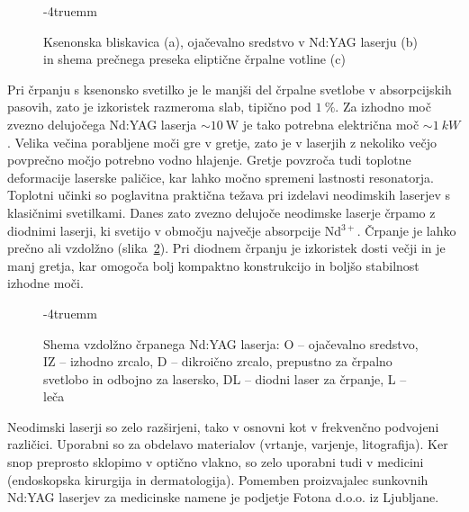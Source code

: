 \begin{figure}[ht]
\centering
\def\svgwidth{120truemm} 

\caption{Ksenonska bliskavica (a), ojačevalno sredstvo v Nd:YAG laserju (b) 
in shema prečnega preseka eliptične črpalne votline (c)}
\label{fig:Nd}
\vglue-4truemm
\end{figure}

Pri črpanju s ksenonsko svetilko je le manjši del črpalne svetlobe v
absorpcijskih pasovih, zato je izkoristek razmeroma slab, tipično 
pod $1~\%$. Za izhodno moč zvezno delujočega Nd:YAG laserja $\sim 10~\si{\watt}$ je tako
potrebna električna moč $\sim 1~\si{kW}$. Velika večina porabljene moči 
gre v gretje, zato je v laserjih z nekoliko večjo povprečno
močjo potrebno vodno hlajenje. Gretje povzroča tudi toplotne deformacije
laserske paličice, kar lahko močno spremeni lastnosti resonatorja. Toplotni
učinki so poglavitna praktična težava pri izdelavi neodimskih
laserjev s klasičnimi svetilkami. Danes zato zvezno delujoče neodimske laserje
črpamo z diodnimi laserji, ki svetijo v območju največje
absorpcije Nd$^{3+}$. Črpanje je lahko prečno ali vzdolžno (slika~\ref{fig:NdS}). 
Pri diodnem črpanju je izkoristek dosti večji in je manj gretja, kar omogoča 
bolj kompaktno konstrukcijo in boljšo stabilnost izhodne moči.
\begin{figure}[ht]
\centering
\def\svgwidth{110truemm} 
\caption{Shema vzdolžno črpanega Nd:YAG laserja: O -- ojačevalno sredstvo, 
IZ -- izhodno zrcalo, D -- dikroično zrcalo, 
prepustno za črpalno svetlobo in odbojno za lasersko, DL -- diodni 
laser za črpanje, L -- leča
}
\label{fig:NdS}
\vglue-4truemm
\end{figure}

Neodimski laserji so zelo razširjeni, tako v osnovni kot v frekvenčno 
podvojeni različici. Uporabni so za obdelavo materialov (vrtanje, varjenje, 
litografija). Ker snop preprosto sklopimo v optično vlakno, so 
zelo uporabni tudi v medicini (endoskopska kirurgija in dermatologija). 
Pomemben proizvajalec sunkovnih Nd:YAG laserjev 
za medicinske namene je podjetje Fotona d.o.o. iz Ljubljane.

